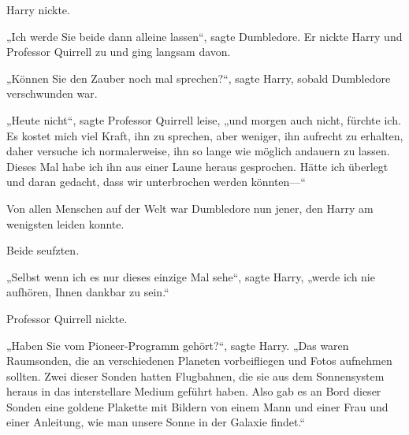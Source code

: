 Harry nickte.

„Ich werde Sie beide dann alleine lassen“, sagte Dumbledore. Er nickte Harry und Professor Quirrell zu und ging langsam davon.

„Können Sie den Zauber noch mal sprechen?“, sagte Harry, sobald Dumbledore verschwunden war.

„Heute nicht“, sagte Professor Quirrell leise, „und morgen auch nicht, fürchte ich. Es kostet mich viel Kraft, ihn zu sprechen, aber weniger, ihn aufrecht zu erhalten, daher versuche ich normalerweise, ihn so lange wie möglich andauern zu lassen. Dieses Mal habe ich ihn aus einer Laune heraus gesprochen. Hätte ich überlegt und daran gedacht, dass wir unterbrochen werden könnten—“

Von allen Menschen auf der Welt war Dumbledore nun jener, den Harry am wenigsten leiden konnte.

Beide seufzten.

„Selbst wenn ich es nur dieses einzige Mal sehe“, sagte Harry, „werde ich nie aufhören, Ihnen dankbar zu sein.“

Professor Quirrell nickte.

„Haben Sie vom Pioneer-Programm gehört?“, sagte Harry. „Das waren Raumsonden, die an verschiedenen Planeten vorbeifliegen und Fotos aufnehmen sollten. Zwei dieser Sonden hatten Flugbahnen, die sie aus dem Sonnensystem heraus in das interstellare Medium geführt haben. Also gab es an Bord dieser Sonden eine goldene Plakette mit Bildern von einem Mann und einer Frau und einer Anleitung, wie man unsere Sonne in der Galaxie findet.“%

